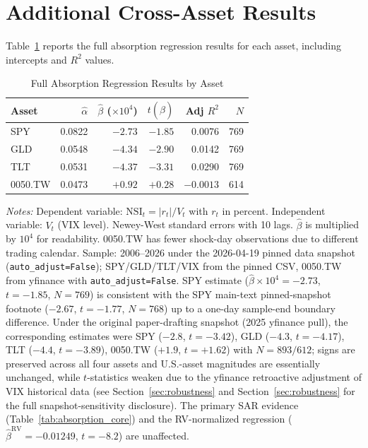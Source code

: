 \documentclass[12pt,a4paper]{article}
\begin{document}
\section{Additional Cross-Asset Results}
\label{app:cross_asset}

Table~\ref{tab:cross_asset_detail} reports the full absorption regression results for each asset, including intercepts and $R^2$ values.

\begin{table}[H]
\centering
\caption{Full Absorption Regression Results by Asset}
\label{tab:cross_asset_detail}
\begin{threeparttable}
\begin{tabular}{lrrrrr}
\toprule
Asset & $\hat{\alpha}$ & $\hat{\beta}$ ($\times 10^4$) & $t(\hat{\beta})$ & Adj $R^2$ & $N$ \\
\midrule
SPY     & 0.0822 & $-2.73$ & $-1.85$ & 0.0076 & 769 \\ %
GLD     & 0.0548 & $-4.34$ & $-2.90$ & 0.0142 & 769 \\ %
TLT     & 0.0531 & $-4.37$ & $-3.31$ & 0.0290 & 769 \\ %
0050.TW & 0.0473 & $+0.92$ & $+0.28$ & $-0.0013$ & 614 \\ %
\bottomrule
\end{tabular}
\begin{tablenotes}
\small
\item \textit{Notes:} Dependent variable: $\text{NSI}_t = |r_t| / V_t$ with $r_t$ in percent. Independent variable: $V_t$ (VIX level). Newey-West standard errors with 10 lags. $\hat{\beta}$ is multiplied by $10^4$ for readability. 0050.TW has fewer shock-day observations due to different trading calendar. Sample: 2006--2026 under the 2026-04-19 pinned data snapshot (\texttt{auto\_adjust=False}); SPY/GLD/TLT/VIX from the pinned CSV, 0050.TW from yfinance with \texttt{auto\_adjust=False}. SPY estimate ($\hat{\beta} \times 10^4 = -2.73$, $t = -1.85$, $N = 769$) is consistent with the SPY main-text pinned-snapshot footnote ($-2.67$, $t = -1.77$, $N = 768$) up to a one-day sample-end boundary difference. Under the original paper-drafting snapshot (2025 yfinance pull), the corresponding estimates were SPY ($-2.8$, $t = -3.42$), GLD ($-4.3$, $t = -4.17$), TLT ($-4.4$, $t = -3.89$), 0050.TW ($+1.9$, $t = +1.62$) with $N = 893/612$; signs are preserved across all four assets and U.S.-asset magnitudes are essentially unchanged, while $t$-statistics weaken due to the yfinance retroactive adjustment of VIX historical data (see Section~\ref{sec:robustness} and Section~\ref{sec:robustness} for the full snapshot-sensitivity disclosure). The primary SAR evidence (Table~\ref{tab:absorption_core}) and the RV-normalized regression ($\hat{\beta}^{\text{RV}} = -0.01249$, $t = -8.2$) are unaffected.

\end{tablenotes}
\end{threeparttable}
\end{table}
\end{document}
